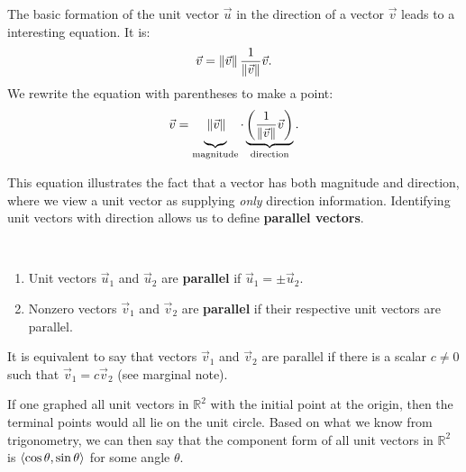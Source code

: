 The basic formation of the unit vector $\vec u$ in the direction of a vector $\vec v$ leads to a interesting equation. It is:
\[\vec v = \left\lVert \vec v \right\rVert\frac{1}{\left\lVert \vec v \right\rVert}\vec v.\]
We rewrite the equation with parentheses to make a point:
\[
\vec v
=\underbrace{\vphantom{\left(\frac1{\norm{\vec v}}\right)}\norm{\vec v}}_{\text{\scriptsize magnitude}}
\cdot
\underbrace{\left(\frac1{\norm{\vec v}}\vec v\right)}_{\text{\scriptsize direction}}.
\]

This equation illustrates the fact that a vector has both magnitude and direction, where we view a unit vector as supplying \emph{only} direction information. Identifying unit vectors with direction allows us to define \textbf{parallel vectors}.

\begin{definition}\label{def:parallel_vectors}%
%
\mbox{}\\[-2\baselineskip]\parbox[t]{\linewidth}{\begin{enumerate}
	\item Unit vectors $\vec u_1$ and $\vec u_2$ are \textbf{parallel} if $\vec u_1 = \pm \vec u_2$.
	\item	Nonzero vectors $\vec v_1$ and $\vec v_2$ are \textbf{parallel} if their respective unit vectors are parallel.
\end{enumerate}}
\end{definition}


It is equivalent to say that vectors $\vec v_1$ and $\vec v_2$ are parallel if there is a scalar $c\neq 0$ such that $\vec v_1 = c\vec v_2$ (see marginal note).

If one graphed all unit vectors in $\mathbb{R}^2$ with the initial point at the origin, then the terminal points would all lie on the unit circle. Based on what we know from trigonometry, we can then say that the component form of all unit vectors in $\mathbb{R}^2$ is $\left\langle \cos\theta,\sin\theta\right\rangle$ for some angle $\theta$.


